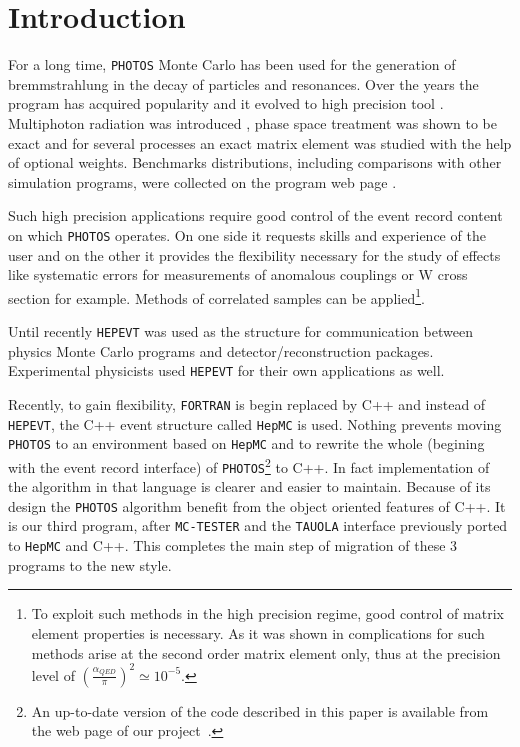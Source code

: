 \documentclass[]{Photos_interface_design}
\begin{document}
\maketitle

\tableofcontents{}

\newpage

\section{Introduction}
For a long time, {\tt PHOTOS} Monte Carlo \cite{Barberio:1990ms,Barberio:1993qi} 
has been used for the generation of bremmstrahlung in the decay of particles and resonances.
Over the years the program has acquired
popularity and it evolved to high 
precision tool \cite{Golonka:2006tw}. Multiphoton radiation was 
introduced \cite{Golonka:2005pn}, phase space treatment was shown to be 
exact \cite{Nanava:2006vv} and for several 
processes \cite{Golonka:2006tw,Nanava:2006vv,Nanava:2009vg}
an exact matrix element was studied with the help of optional weights.
Benchmarks distributions, including comparisons with  
other simulation programs, were collected on the program web page \cite{Photos_tests}. 

 Such high precision applications require good control of the event record content on which {\tt PHOTOS} operates. On one side it 
requests skills and experience of the user and on the other it provides 
the flexibility necessary for the study of effects like systematic errors for 
measurements of anomalous couplings or W cross section for example. Methods of 
correlated samples  can be applied\footnote{To exploit such methods in 
the high precision regime, good control of matrix element properties is necessary.
As it was shown in \cite{Kleiss:1990jv} complications for such methods arise at the second order matrix element only, thus at the precision level of 
$(\frac{\alpha_{QED}}{\pi})^2 \simeq 10^{-5}$.}. 

Until recently {\tt HEPEVT} \cite{Altarelli:1989wu} was used as the structure for 
communication between physics Monte Carlo programs and detector/reconstruction 
packages. Experimental physicists used {\tt HEPEVT} 
for their own applications  as well.

Recently, to gain  flexibility, {\tt FORTRAN} is begin replaced by C++ and 
instead of {\tt HEPEVT}, the C++ event structure called {\tt HepMC} \cite{Dobbs:2001ck}
is used. Nothing prevents 
moving {\tt PHOTOS} to an environment based on  {\tt HepMC}
and to rewrite the whole (begining with the event record interface)
of {\tt PHOTOS}\footnote{An up-to-date version of the code described in this paper is
available from the web page of our project~\cite{photosC++}. 
  }
 to C++. In fact implementation of the algorithm in that language 
is clearer and easier to
 maintain. Because of its design the {\tt PHOTOS} algorithm benefit from the object 
oriented features of C++. It is our third program, after {\tt MC-TESTER} \cite{Davidson:2008ma}
and the {\tt TAUOLA} interface \cite{Davidson:2010rw} previously ported to {\tt HepMC} and C++.
This completes the main step of migration of these 3 programs to the new style.
\end{document}
